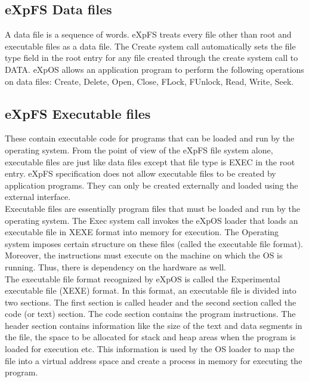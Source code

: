 \subsection{eXpFS Data files}
A data file is a sequence of words. eXpFS treats every file other than root and executable files as a data file. The Create system call automatically sets the file type field in the root entry for any file created through the create system call to DATA. eXpOS allows an application program to perform the following operations on data files: Create, Delete, Open, Close, FLock, FUnlock, Read, Write, Seek.  

\subsection{eXpFS Executable files}
 These contain executable code for programs that can be loaded and run by the operating system. From the point of view of the eXpFS file system alone, executable files are just like data files except that file type is EXEC in the root entry. eXpFS specification does not allow executable files to be created by application programs. They can only be created externally and loaded using the external interface.
\\

Executable files are essentially program files that must be loaded and run by the operating system. The Exec system call invokes the eXpOS loader that loads an executable file in XEXE format into memory for execution. The Operating system imposes certain structure on these files (called the executable file format). Moreover, the instructions must execute on the machine on which the OS is running. Thus, there is dependency on the hardware as well.
\\

The executable file format recognized by eXpOS is called the Experimental executable file (XEXE) format. In this format, an executable file is divided into two sections. The first section is called header and the second section called the code (or text) section. The code section contains the program instructions. The header section contains information like the size of the text and data segments in the file, the space to be allocated for stack and heap areas when the program is loaded for execution etc. This information is used by the OS loader to map the file into a virtual address space and create a process in memory for executing the program.



